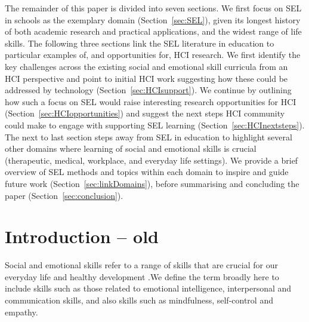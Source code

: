 \documentclass[prodmode,acmtochi]{acmsmall}
\begin{document}
The remainder of this paper is divided into seven sections.  We first focus on SEL in schools as the exemplary domain (Section~\ref{sec:SEL}), given its longest history of both academic research and practical applications, and the  widest range of life skills. The following three sections link the SEL literature in education to particular examples of, and opportunities for, HCI research. We first identify the key challenges across the existing social and emotional skill curricula from an HCI perspective and point to initial HCI work suggesting how these could be addressed by technology (Section~\ref{sec:HCIsupport}). We continue by outlining how such a focus on SEL would raise interesting research opportunities for HCI (Section~\ref{sec:HCIopportunities}) and suggest the next steps HCI community could make to engage with supporting SEL learning (Section~\ref{sec:HCInextsteps}). 
The next to last section steps away from SEL in education to highlight several other domains where learning of social and emotional skills is crucial (therapeutic, medical, workplace, and everyday life settings). We provide a brief overview of SEL methods and topics within each domain to inspire and guide future work (Section~\ref{sec:linkDomains}), before summarising and concluding the paper (Section~\ref{sec:conclusion}).  






\iffalse
\section{Introduction -- old}
 
 Social and emotional skills refer to a range of skills that are crucial for our everyday life and healthy development \cite{Weare2011,Adi2007a,Damon2006}.We define the term broadly here to include skills such as those related to emotional intelligence, interpersonal and communication skills, and also skills such as mindfulness, self-control and empathy. 
\end{document}
